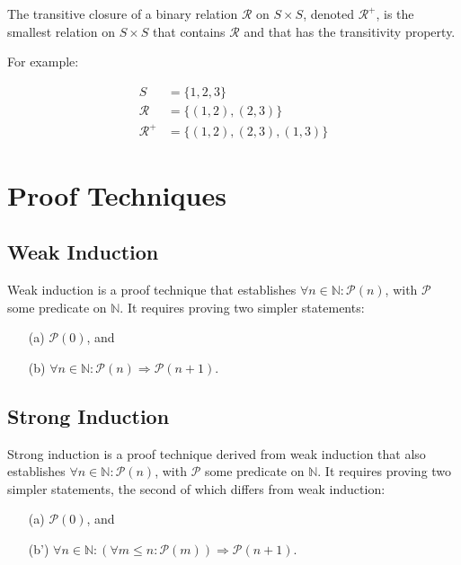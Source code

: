 The transitive closure of a binary relation $\mathcal{R}$ on $S \times S$,
denoted $\mathcal{R}^+$, is
the smallest relation on $S \times S$ that contains $\mathcal{R}$ and that 
has the transitivity property.

For example:

\begin{align*}
S &= \{1, 2, 3\} \\
\mathcal{R} &= \{(1, 2), (2, 3)\} \\
\mathcal{R}^+ &= \{(1, 2), (2, 3), (1, 3)\}
\end{align*}

\section*{Proof Techniques}

\subsection*{Weak Induction}

Weak induction is a proof technique that establishes $\forall n \in \mathbb{N}:
\mathcal{P}(n)$, with $\mathcal{P}$ some predicate on $\mathbb{N}$.
It requires proving two simpler statements:
\begin{itemize}
\item[(a)] $\mathcal{P}(0)$, and
\item[(b)] $\forall n \in \mathbb{N}: \mathcal{P}(n) \Rightarrow \mathcal{P}(n+1)$.
\end{itemize}

\subsection*{Strong Induction}

Strong induction is a proof technique derived from weak induction that also
establishes $\forall n \in \mathbb{N}: \mathcal{P}(n)$, with $\mathcal{P}$ some
predicate on $\mathbb{N}$. It requires proving two simpler statements, the second
of which differs from weak induction:
\begin{itemize}
\item[(a)] $\mathcal{P}(0)$, and
\item[(b')] $\forall n \in \mathbb{N}: (\forall m \leq n: \mathcal{P}(m)) \Rightarrow \mathcal{P}(n+1)$.
\end{itemize}

